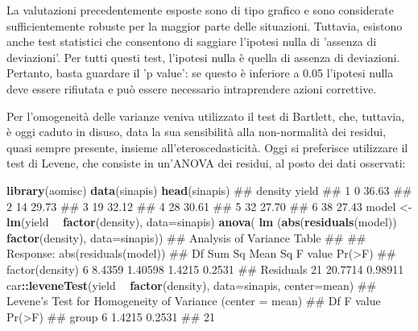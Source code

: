 \documentclass[a4paper,12pt,oneside]{book}
\newenvironment{Shaded}{\begin{snugshade}}{\end{snugshade}}
\newcommand{\KeywordTok}[1]{\textcolor[rgb]{0.13,0.29,0.53}{\textbf{#1}}}
\newcommand{\DataTypeTok}[1]{\textcolor[rgb]{0.13,0.29,0.53}{#1}}
\newcommand{\StringTok}[1]{\textcolor[rgb]{0.31,0.60,0.02}{#1}}
\newcommand{\OperatorTok}[1]{\textcolor[rgb]{0.81,0.36,0.00}{\textbf{#1}}}
\newcommand{\NormalTok}[1]{#1}
\theoremstyle{definition}
\theoremstyle{definition}
\theoremstyle{definition}
\theoremstyle{remark}
\begin{document}
La valutazioni precedentemente esposte sono di tipo grafico e sono
considerate sufficientemente robuste per la maggior parte delle
situazioni. Tuttavia, esistono anche test statistici che consentono di
saggiare l'ipotesi nulla di 'assenza di deviazioni'. Per tutti questi
test, l'ipotesi nulla è quella di assenza di deviazioni. Pertanto, basta
guardare il 'p value': se questo è inferiore a 0.05 l'ipotesi nulla deve
essere rifiutata e può essere necessario intraprendere azioni
correttive.

Per l'omogeneità delle varianze veniva utilizzato il test di Bartlett,
che, tuttavia, è oggi caduto in disuso, data la sua sensibilità alla
non-normalità dei residui, quasi sempre presente, insieme
all'eteroscedasticità. Oggi si preferisce utilizzare il test di Levene,
che consiste in un'ANOVA dei residui, al posto dei dati osservati:

\begin{Shaded}
\begin{Highlighting}[]
\KeywordTok{library}\NormalTok{(aomisc)}
\KeywordTok{data}\NormalTok{(sinapis)}
\KeywordTok{head}\NormalTok{(sinapis)}
\NormalTok{##   density yield}
\NormalTok{## 1       0 36.63}
\NormalTok{## 2      14 29.73}
\NormalTok{## 3      19 32.12}
\NormalTok{## 4      28 30.61}
\NormalTok{## 5      32 27.70}
\NormalTok{## 6      38 27.43}
\NormalTok{model <-}\StringTok{ }\KeywordTok{lm}\NormalTok{(yield }\OperatorTok{~}\StringTok{ }\KeywordTok{factor}\NormalTok{(density), }\DataTypeTok{data=}\NormalTok{sinapis)}
\KeywordTok{anova}\NormalTok{( }\KeywordTok{lm}\NormalTok{ (}\KeywordTok{abs}\NormalTok{(}\KeywordTok{residuals}\NormalTok{(model)) }\OperatorTok{~}\StringTok{ }\KeywordTok{factor}\NormalTok{(density), }\DataTypeTok{data=}\NormalTok{sinapis))}
\NormalTok{## Analysis of Variance Table}
\NormalTok{## }
\NormalTok{## Response: abs(residuals(model))}
\NormalTok{##                 Df  Sum Sq Mean Sq F value Pr(>F)}
\NormalTok{## factor(density)  6  8.4359 1.40598  1.4215 0.2531}
\NormalTok{## Residuals       21 20.7714 0.98911}
\NormalTok{car}\OperatorTok{::}\KeywordTok{leveneTest}\NormalTok{(yield }\OperatorTok{~}\StringTok{ }\KeywordTok{factor}\NormalTok{(density), }\DataTypeTok{data=}\NormalTok{sinapis, }\DataTypeTok{center=}\NormalTok{mean)}
\NormalTok{## Levene's Test for Homogeneity of Variance (center = mean)}
\NormalTok{##       Df F value Pr(>F)}
\NormalTok{## group  6  1.4215 0.2531}
\NormalTok{##       21}
\end{Highlighting}
\end{Shaded}
\end{document}
